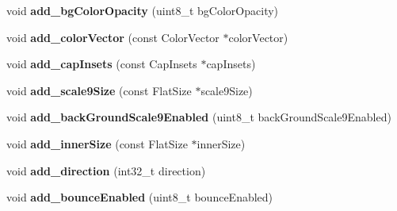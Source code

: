 \begin{DoxyCompactItemize}
\item 
\mbox{\label{structflatbuffers_1_1ListViewOptionsBuilder_ac6385314cf622a941329888c6f5fb1e7}} 
void {\bfseries add\+\_\+bg\+Color\+Opacity} (uint8\+\_\+t bg\+Color\+Opacity)
\item 
\mbox{\label{structflatbuffers_1_1ListViewOptionsBuilder_a5840b8b9542a2212fbe5c66b19a39059}} 
void {\bfseries add\+\_\+color\+Vector} (const Color\+Vector $\ast$color\+Vector)
\item 
\mbox{\label{structflatbuffers_1_1ListViewOptionsBuilder_a39189d624899aa9078a6f22c8ffaab92}} 
void {\bfseries add\+\_\+cap\+Insets} (const Cap\+Insets $\ast$cap\+Insets)
\item 
\mbox{\label{structflatbuffers_1_1ListViewOptionsBuilder_a55ac4f16142be868534ffdb3bb6745e8}} 
void {\bfseries add\+\_\+scale9\+Size} (const Flat\+Size $\ast$scale9\+Size)
\item 
\mbox{\label{structflatbuffers_1_1ListViewOptionsBuilder_a584b3d7c6d9ebae7c2ff884465aa709d}} 
void {\bfseries add\+\_\+back\+Ground\+Scale9\+Enabled} (uint8\+\_\+t back\+Ground\+Scale9\+Enabled)
\item 
\mbox{\label{structflatbuffers_1_1ListViewOptionsBuilder_a20c92e200476e2de4bc62cddbe439469}} 
void {\bfseries add\+\_\+inner\+Size} (const Flat\+Size $\ast$inner\+Size)
\item 
\mbox{\label{structflatbuffers_1_1ListViewOptionsBuilder_a90a136d0729147e3672dd797ee1940aa}} 
void {\bfseries add\+\_\+direction} (int32\+\_\+t direction)
\item 
\mbox{\label{structflatbuffers_1_1ListViewOptionsBuilder_a7ad66027451c1b04a915db99515c407e}} 
void {\bfseries add\+\_\+bounce\+Enabled} (uint8\+\_\+t bounce\+Enabled)
\item 
\mbox{\label{structflatbuffers_1_1ListViewOptionsBuilder_a7fc583791df1d02173ce810d729bc0b3}} 

\end{DoxyCompactItemize}
